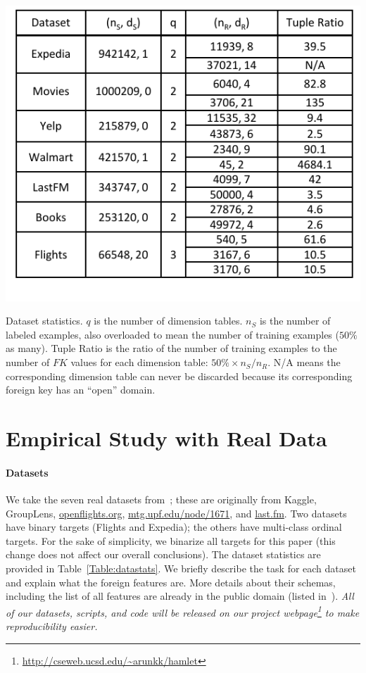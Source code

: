 \documentclass[sigconf]{acmart}
\begin{document}
\begin{table}[t]
\centering
\includegraphics[width=0.99\linewidth]{table1.pdf}
\caption{Dataset statistics. $q$ is the number of dimension tables. $n_S$ is the number of labeled examples, also overloaded to mean the number of training examples ($50\%$ as many). 
Tuple Ratio is the ratio of the number of training examples to the number of $FK$ values for each dimension table: $50\% \times n_S / n_R$. 
N/A means the corresponding dimension table can never be discarded because its corresponding foreign key has an ``open'' domain. 
}
\label{Table:datastats}
\vspace{-4mm}
\end{table}

\section{Empirical Study with Real Data}

\paragraph*{\textbf{Datasets}}
We take the seven real datasets from~\cite{hamlet}; these are originally from Kaggle, GroupLens, \url{openflights.org}, \url{mtg.upf.edu/node/1671}, and \url{last.fm}.
Two datasets have binary targets (Flights and Expedia); the others have multi-class ordinal targets. For the sake of simplicity, we binarize all targets 
for this paper (this change does not affect our overall conclusions). The dataset statistics are provided in Table~\ref{Table:datastats}. 
We briefly describe the task for each dataset and explain what the foreign features are. More details about their schemas, including the list 
of all features are already in the public domain (listed in~\cite{hamlet}). 
\textit{All of our datasets, scripts, and code will be released on our project webpage\footnote{\url{http://cseweb.ucsd.edu/~arunkk/hamlet}} to make reproducibility easier.}
\end{document}
